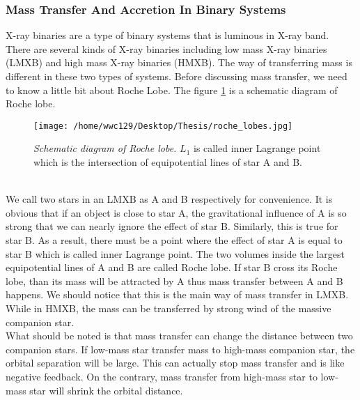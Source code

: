 \documentclass[12pt]{report}
\begin{document}
            \subsubsection{Mass Transfer And Accretion In Binary Systems}
                X-ray binaries are a type of binary systems that is luminous in X-ray band. There are several kinds 
                of X-ray binaries including low mass X-ray binaries (LMXB) and high mass X-ray binaries (HMXB). 
                The way of transferring mass is different in these two types of systems. Before discussing mass 
                transfer, we need to know a little bit about Roche Lobe. The figure \ref{fig:roche lobe} is a 
                schematic diagram of Roche lobe.
                \begin{figure}[h]
                  \centering
                  \texttt{[image: /home/wwc129/Desktop/Thesis/roche\_lobes.jpg]}
                  \begin{minipage}{0.8\textwidth}
                  \caption{\footnotesize \textit{Schematic diagram of Roche lobe.} $L_{1}$ is called inner 
                            Lagrange point which is the intersection of equipotential lines of star A 
                            and B.}
                  \label{fig:roche lobe}
                  \end{minipage}
                \end{figure}\\
                \indent  We call two stars in an LMXB as A and B respectively for convenience. It is obvious 
                that if an object is close to star A, the gravitational influence of A is so strong that we can 
                nearly ignore the effect of star B. Similarly, this is true for star B. As a result, there must be 
                a point where the effect of star A is equal to star B which is called inner Lagrange point. The two
                volumes inside the largest equipotential lines of A and B are called Roche lobe. If star B cross 
                its Roche lobe, than its mass will be attracted by A thus mass transfer between A and B happens. We 
                should notice that this is the main way of mass transfer in LMXB. While in HMXB, the mass can be 
                transferred by strong wind of the massive companion star. \\
                \indent 
                What should be noted is that mass transfer can change the distance between two companion stars. If 
                low-mass star transfer mass to high-mass companion star, the orbital separation will be large. 
                This can actually stop mass transfer and is like negative feedback. 
                On the contrary, mass transfer from high-mass star to low-mass star will shrink the orbital 
                distance.\\
                
\end{document}
